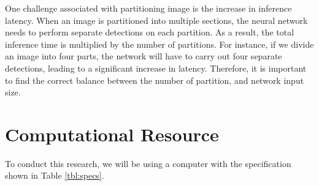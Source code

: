   One challenge associated with partitioning image is the increase in inference latency.
  When an image is partitioned into multiple sections, the neural network needs to perform separate detections on each partition.
  As a result, the total inference time is multiplied by the number of partitions.
  For instance, if we divide an image into four parts, the network will have to carry out four separate detections, leading to a significant increase in latency. 
  Therefore, it is important to find the correct balance between the number of partition, and network input size.
    
\section{Computational Resource}
\label{section:instrument}
To conduct this research, we will be using a computer with the specification shown in Table \ref{tbl:specs}.
\begin{table}[h!]
  \centering
  \label{tbl:specs}
  

\end{table}

